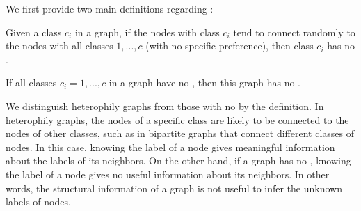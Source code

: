 We first provide two main definitions regarding \nef:
\begin{definition}
\label{def:noGNEclass}
Given a class $c_{i}$ in a graph, if the nodes with class $c_{i}$ tend to connect randomly to the nodes with all classes $1, ..., c$ (with no specific preference), then class $c_{i}$ has no \nef.
\end{definition}
\begin{definition}
\label{def:noGNEall}
If all classes $c_{i}=1,...,c$ in a graph have no \nef, then this graph has no \nef.
\end{definition}
\noindent
We distinguish heterophily graphs from those with no \nef by the definition.
In heterophily graphs, the nodes of a specific class are likely to be connected to the nodes of other classes, such as in bipartite graphs that connect different classes of nodes.
In this case, knowing the label of a node gives meaningful information about the labels of its neighbors.
On the other hand, if a graph has no \nef, knowing the label of a node gives no useful information about its neighbors.
In other words, the structural information of a graph is not useful to infer the unknown labels of nodes.


